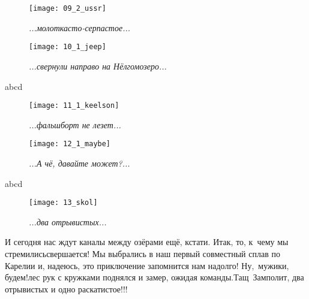 \newpage

\begin{figure}[h]
	\centering
	\texttt{[image: 09\_2\_ussr]}
	\caption{\small\textit{...молоткасто-серпастое...}}
\end{figure}

\newpage

\begin{figure}[h]
	\centering
	\texttt{[image: 10\_1\_jeep]}
	\caption{\small\textit{...свернули направо на Нёлгомозеро...}}
\end{figure}

abcd

\begin{figure}[h]
	\centering
	\texttt{[image: 11\_1\_keelson]}
	\caption{\small\textit{...фальшборт не лезет...}}
\end{figure}

\newpage

\begin{figure}[h]
	\centering
	\texttt{[image: 12\_1\_maybe]}
	\caption{\small\textit{...А чё, давайте может?...}}
\end{figure}

abcd

\newpage

\begin{wrapfigure}[10]{l}{0.52\textwidth}
	\setlength{\belowcaptionskip}{-10pt}
		\centering
		\texttt{[image: 13\_skol]}
		\caption{\small\textit{...два отрывистых...}}
\end{wrapfigure}

\noindent И сегодня нас ждут каналы между озёрами ещё, кстати. Итак, то, к~чему мы стремились\mdash свершается! Мы выбрались в наш первый совместный сплав по Карелии и, надеюсь, это приключение запомнится нам надолго! Ну,~мужики, будем!\mdash лес рук с кружками поднялся и замер, ожидая команды.\mdash Тащ~Замполит, два отрывистых и одно раскатистое!!!

\newpage

